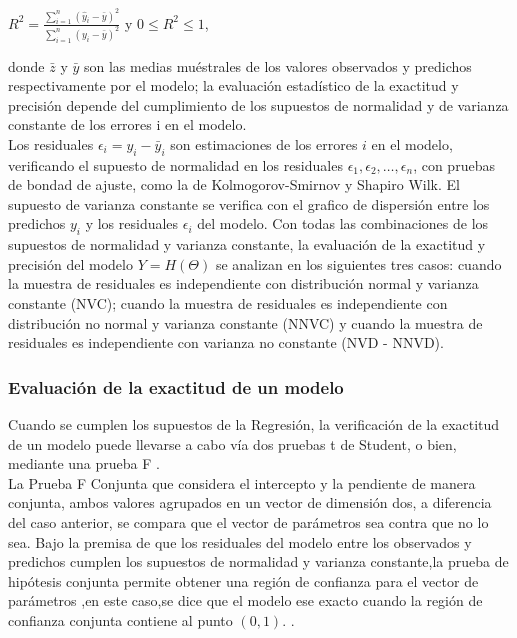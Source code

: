 \begin{center}
{\Large $R^{2} = \frac{ \sum_{i=1}^{n} ( \hat{y}_{i} - \bar{y})^{2}} { \sum_{i=1}^{n} ( y_{i} - \bar{y})^{2}  }$ }  y  $ 0 \leq R^{2} \leq 1$,
\end{center}


donde $ \bar{z}$ y $ \bar{y}$ son las medias muéstrales de los valores observados y predichos respectivamente por el modelo; la evaluación estadístico de la exactitud y precisión depende del cumplimiento de los supuestos de normalidad y de varianza constante de los errores i en el modelo. \\


Los residuales $\epsilon_{i} = y_{i} - \bar{y}_{i}$ son estimaciones de los errores $i$ en el modelo, verificando el  supuesto de normalidad en los residuales $\epsilon_{1}, \epsilon_{2} , \dots, \epsilon_{n} $, con pruebas de bondad de ajuste, como la de Kolmogorov-Smirnov y Shapiro Wilk. El supuesto de varianza constante se verifica con el grafico de dispersión entre los predichos $y_{i}$ y los residuales $\epsilon_{i}$ del modelo. Con todas las combinaciones de los supuestos de normalidad y varianza constante, la evaluación de la exactitud y precisión del modelo $Y = H(\Theta )$ se analizan en los siguientes tres casos: cuando la muestra de residuales es independiente con distribución normal y varianza constante (NVC); cuando la muestra de residuales es independiente con distribución no normal y varianza constante (NNVC) y cuando la muestra
de residuales es independiente con varianza no constante (NVD - NNVD).

\subsubsection{Evaluación de la exactitud de un modelo}

Cuando se cumplen los supuestos de la Regresión, la verificación de la exactitud de un modelo puede llevarse a cabo vía dos pruebas t de Student, o bien, mediante una prueba F \parencite{balam-2012}.\\

La Prueba F Conjunta que considera el intercepto y la pendiente de manera conjunta, ambos valores agrupados en un vector de dimensión dos, a diferencia del caso anterior, se compara que el vector de parámetros  sea  contra que no lo sea. Bajo la premisa de que los residuales del modelo entre los observados y predichos cumplen los supuestos de normalidad y varianza constante,la prueba de hipótesis conjunta permite obtener una región de confianza para el vector de parámetros ,en este caso,se dice que el modelo ese exacto cuando la región de confianza conjunta contiene al punto $(0,1)$. \parencite{zacarias-2023}.\\

